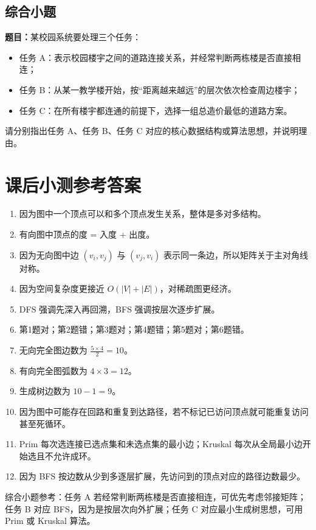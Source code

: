 \documentclass{../../note}
\begin{document}
\subsection{综合小题}

\textbf{题目：}某校园系统要处理三个任务：

\begin{itemize}
  \item 任务 A：表示校园楼宇之间的道路连接关系，并经常判断两栋楼是否直接相连；
  \item 任务 B：从某一教学楼开始，按“距离越来越远”的层次依次检查周边楼宇；
  \item 任务 C：在所有楼宇都连通的前提下，选择一组总造价最低的道路方案。
\end{itemize}

请分别指出任务 A、任务 B、任务 C 对应的核心数据结构或算法思想，并说明理由。

\section{课后小测参考答案}

\begin{enumerate}
  \item 因为图中一个顶点可以和多个顶点发生关系，整体是多对多结构。
  \item 有向图中顶点的度 = 入度 + 出度。
  \item 因为无向图中边 $(v_i, v_j)$ 与 $(v_j, v_i)$ 表示同一条边，所以矩阵关于主对角线对称。
  \item 因为空间复杂度更接近 $O(|V| + |E|)$，对稀疏图更经济。
  \item DFS 强调先深入再回溯，BFS 强调按层次逐步扩展。
  \item 第1题对；第2题错；第3题对；第4题错；第5题对；第6题错。
  \item 无向完全图边数为 $\frac{5 \times 4}{2} = 10$。
  \item 有向完全图弧数为 $4 \times 3 = 12$。
  \item 生成树边数为 $10 - 1 = 9$。
  \item 因为图中可能存在回路和重复到达路径，若不标记已访问顶点就可能重复访问甚至死循环。
  \item Prim 每次选连接已选点集和未选点集的最小边；Kruskal 每次从全局最小边开始选且不允许成环。
  \item 因为 BFS 按边数从少到多逐层扩展，先访问到的顶点对应的路径边数最少。
\end{enumerate}

综合小题参考：任务 A 若经常判断两栋楼是否直接相连，可优先考虑邻接矩阵；任务 B 对应 BFS，因为是按层次向外扩展；任务 C 对应最小生成树思想，可用 Prim 或 Kruskal 算法。
\end{document}
